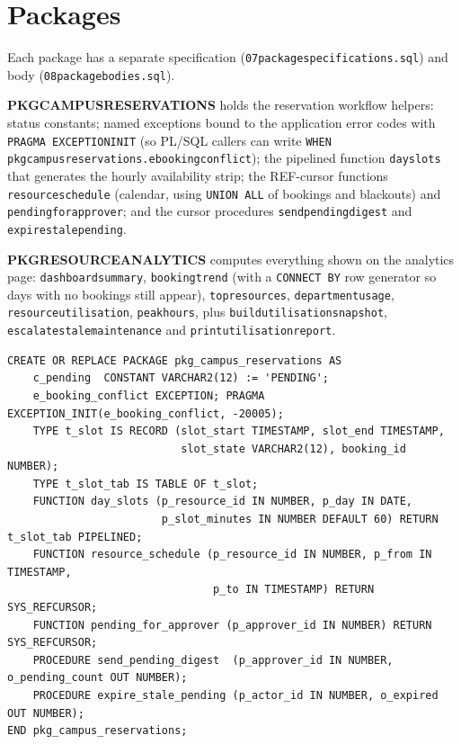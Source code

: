 \documentclass[12pt,a4paper,oneside]{report}
\renewcommand{\_}{\origus\allowbreak}
\begin{document}
\section{Packages}\label{sec:pkg}
Each package has a separate specification (\texttt{07\_package\_specifications.sql}) and body (\texttt{08\_package\_bodies.sql}).

\textbf{PKG\_CAMPUS\_RESERVATIONS} holds the reservation workflow helpers: status constants; named exceptions bound to the application error codes with \texttt{PRAGMA EXCEPTION\_INIT} (so PL/SQL callers can write \texttt{WHEN pkg\_campus\_reservations.e\_booking\_conflict}); the pipelined function \texttt{day\_slots} that generates the hourly availability strip; the REF-cursor functions \texttt{resource\_schedule} (calendar, using \texttt{UNION ALL} of bookings and blackouts) and \texttt{pending\_for\_approver}; and the cursor procedures \texttt{send\_pending\_digest} and \texttt{expire\_stale\_pending}.

\textbf{PKG\_RESOURCE\_ANALYTICS} computes everything shown on the analytics page: \texttt{dashboard\_summary}, \texttt{booking\_trend} (with a \texttt{CONNECT BY} row generator so days with no bookings still appear), \texttt{top\_resources}, \texttt{department\_usage}, \texttt{resource\_utilisation}, \texttt{peak\_hours}, plus \texttt{build\_utilisation\_snapshot}, \texttt{escalate\_stale\_maintenance} and \texttt{print\_utilisation\_report}.

\begin{lstlisting}[language=PLSQL,caption={Package specification (excerpt)},label=lst:pkgspec]
CREATE OR REPLACE PACKAGE pkg_campus_reservations AS
    c_pending  CONSTANT VARCHAR2(12) := 'PENDING';
    e_booking_conflict EXCEPTION; PRAGMA EXCEPTION_INIT(e_booking_conflict, -20005);
    TYPE t_slot IS RECORD (slot_start TIMESTAMP, slot_end TIMESTAMP,
                           slot_state VARCHAR2(12), booking_id NUMBER);
    TYPE t_slot_tab IS TABLE OF t_slot;
    FUNCTION day_slots (p_resource_id IN NUMBER, p_day IN DATE,
                        p_slot_minutes IN NUMBER DEFAULT 60) RETURN t_slot_tab PIPELINED;
    FUNCTION resource_schedule (p_resource_id IN NUMBER, p_from IN TIMESTAMP,
                                p_to IN TIMESTAMP) RETURN SYS_REFCURSOR;
    FUNCTION pending_for_approver (p_approver_id IN NUMBER) RETURN SYS_REFCURSOR;
    PROCEDURE send_pending_digest  (p_approver_id IN NUMBER, o_pending_count OUT NUMBER);
    PROCEDURE expire_stale_pending (p_actor_id IN NUMBER, o_expired OUT NUMBER);
END pkg_campus_reservations;
\end{lstlisting}
\end{document}
